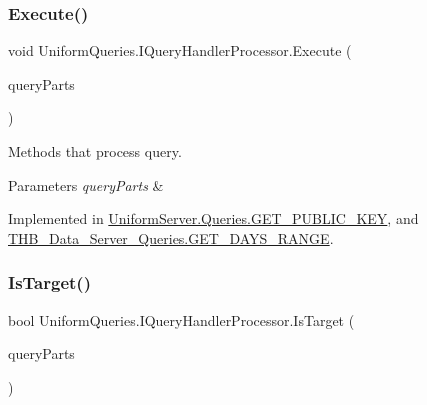\mbox{\label{interface_uniform_queries_1_1_i_query_handler_processor_a2cf42ac286a12dea98c703a86478d36b}} 
\subsubsection{\texorpdfstring{Execute()}{Execute()}}
{\footnotesize\ttfamily void Uniform\+Queries.\+I\+Query\+Handler\+Processor.\+Execute (\begin{DoxyParamCaption}\item[{\mbox{\hyperlink{struct_uniform_queries_1_1_query_part}{Query\+Part}} \mbox{[}$\,$\mbox{]}}]{query\+Parts }\end{DoxyParamCaption})}



Methods that process query. 


\begin{DoxyParams}{Parameters}
{\em query\+Parts} & \\
\hline
\end{DoxyParams}


Implemented in \mbox{\hyperlink{class_uniform_server_1_1_queries_1_1_g_e_t___p_u_b_l_i_c___k_e_y_a63367fa9543a3fb4a1126373a833c317}{Uniform\+Server.\+Queries.\+G\+E\+T\+\_\+\+P\+U\+B\+L\+I\+C\+\_\+\+K\+EY}}, and \mbox{\hyperlink{class_t_h_b___data___server___queries_1_1_g_e_t___d_a_y_s___r_a_n_g_e_a6c1884577a045fad484de904dc0da636}{T\+H\+B\+\_\+\+Data\+\_\+\+Server\+\_\+\+Queries.\+G\+E\+T\+\_\+\+D\+A\+Y\+S\+\_\+\+R\+A\+N\+GE}}.

\mbox{\label{interface_uniform_queries_1_1_i_query_handler_processor_a0edbfe93aab9f1787e4dc0311f7695c7}} 
\subsubsection{\texorpdfstring{Is\+Target()}{IsTarget()}}
{\footnotesize\ttfamily bool Uniform\+Queries.\+I\+Query\+Handler\+Processor.\+Is\+Target (\begin{DoxyParamCaption}\item[{\mbox{\hyperlink{struct_uniform_queries_1_1_query_part}{Query\+Part}} \mbox{[}$\,$\mbox{]}}]{query\+Parts }\end{DoxyParamCaption})}




